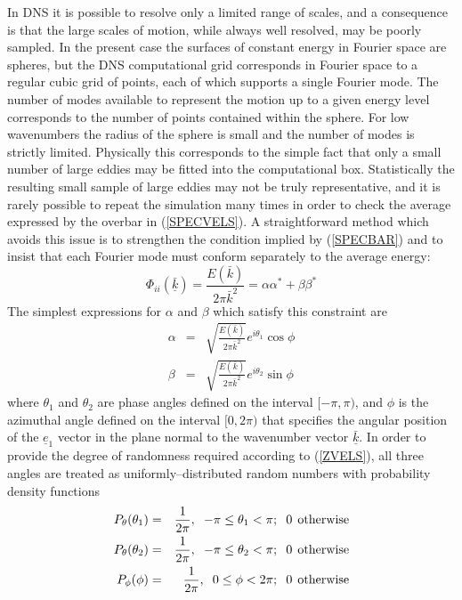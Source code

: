 \documentclass[dvips]{article}
\begin{document}
In DNS it is possible to resolve only a limited range of scales, and a
consequence is that the large scales of motion, while always well resolved,
may be poorly sampled.  In the present case the surfaces of constant energy
in Fourier space are spheres, but the DNS computational grid 
corresponds in Fourier space to a regular cubic grid of points, each of
which supports a single Fourier mode.  The number of modes available
to represent the motion up to a given energy level corresponds to the number
of points contained within the sphere.  For low wavenumbers the radius
of the sphere is small and the number of modes is strictly limited.
Physically this corresponds to the simple fact
that only a small number of large eddies may be fitted into
the computational box.  Statistically the resulting small sample of large
eddies may not be truly representative, and it is rarely possible to repeat
the simulation many times in order to check the average expressed by
the overbar in (\ref{SPECVELS}).
A straightforward method which avoids this issue is
to strengthen the condition implied by (\ref{SPECBAR}) and to insist
that each Fourier mode
must conform separately to the average energy:
\begin{equation}
\Phi_{ii}(\underline{\bar{k}}) = \frac{E(\bar{k})}{2\pi \bar{k}^{2}}
 = \alpha\alpha^{*} + \beta\beta^{*}
\label{KCOND}
\end{equation}
The simplest expressions for $\alpha$ and $\beta$ which satisfy
this constraint are 
\begin{eqnarray}
\alpha & = & \sqrt{\frac{E(\bar{k})}{2\pi \bar{k}^{2}}}e^{i\theta_{1}}\cos{\phi}\nonumber\\
\beta & = & \sqrt{\frac{E(\bar{k})}{2\pi \bar{k}^{2}}}e^{i\theta_{2}}\sin{\phi}
\label{ALPHABET}
\end{eqnarray}
where $\theta_{1}$ and $\theta_{2}$ are phase angles defined on the
interval $[-\pi,\pi)$, and $\phi$ is the azimuthal angle defined on the
interval $[0,2\pi)$ that specifies the angular position
of the $\underline{e}_{1}$ vector in the plane normal
to the wavenumber vector $\underline{\bar{k}}$.  In order to provide the
degree of randomness required according to (\ref{ZVELS}), all three angles
are treated as uniformly--distributed random numbers with probability
density functions
\begin{eqnarray}
P_{\theta}(\theta_{1}) & = & \frac{1}{2\pi},\hspace{2mm}-\pi\le\theta_{1} < \pi;
\hspace{2mm} 0 \hspace{1.5mm}{\rm otherwise} \\
P_{\theta}(\theta_{2}) & = & \frac{1}{2\pi},\hspace{2mm}-\pi\le\theta_{2} < \pi;
\hspace{2mm} 0 \hspace{1.5mm}{\rm otherwise} \\
P_{\phi}(\phi) & = & \frac{1}{2\pi},\hspace{2mm}0\le\phi < 2\pi;
\hspace{2mm} 0 \hspace{1.5mm}{\rm otherwise}
\end{eqnarray}
\end{document}
